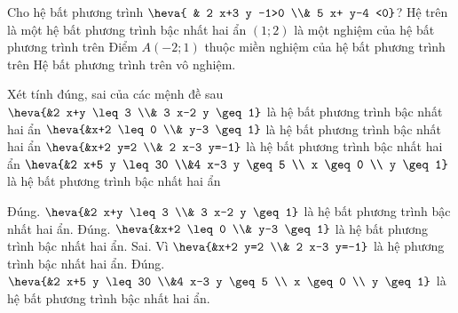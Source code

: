 \begin{ex}%
	Cho hệ bất phương trình $\heva{	& 2 x+3 y -1>0 \\& 5 x+ y-4 <0}$?	
	\choiceTF
	{\True Hệ trên là một hệ bất phương trình bậc nhất hai ẩn}
	{$\left(1; 2\right)$ là một nghiệm của hệ bất phương trình trên}
	{Điểm  $A\left(-2; 1\right)$ thuộc miền  nghiệm của hệ bất phương trình trên}
	{Hệ bất phương trình trên vô nghiệm.}
\end{ex}
\begin{ex}%
	 Xét tính đúng, sai của các mệnh đề sau
	 \choiceTF
{$\heva{&2 x+y \leq 3 \\& 3 x-2 y \geq 1}$ là hệ bất phương trình bậc nhất hai ẩn}
{$\heva{&x+2 \leq 0 \\& y-3 \geq 1}$ là hệ bất phương trình bậc nhất hai ẩn}
{$\heva{&x+2 y=2 \\& 2 x-3 y=-1}$ là hệ bất phương trình bậc nhất hai ẩn}
{$\heva{&2 x+5 y \leq 30 \\&4 x-3 y \geq 5 \\ x \geq 0 \\ y \geq 1}$ là hệ bất phương trình bậc nhất hai ẩn}
\begin{itemchoice}
\itemch Đúng. $\heva{&2 x+y \leq 3 \\& 3 x-2 y \geq 1}$ là hệ bất phương trình bậc nhất hai ẩn.
\itemch Đúng. $\heva{&x+2 \leq 0 \\& y-3 \geq 1}$ là hệ bất phương trình bậc nhất hai ẩn.
\itemch Sai. Vì $\heva{&x+2 y=2 \\& 2 x-3 y=-1}$ là hệ  phương trình bậc nhất hai ẩn.
\itemch Đúng. $\heva{&2 x+5 y \leq 30 \\&4 x-3 y \geq 5 \\ x \geq 0 \\ y \geq 1}$ là hệ bất phương trình bậc nhất hai ẩn.
\end{itemchoice}
	
\end{ex}	
